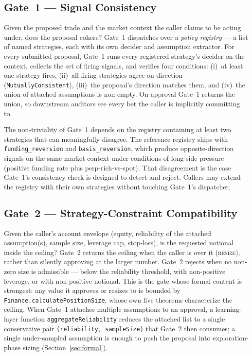 \documentclass[11pt, a4paper]{article}
\begin{document}
\subsection{Gate~1 --- Signal Consistency}
Given the proposed trade and the market context the caller claims to be
acting under, does the proposal cohere? Gate~1 dispatches over a
\emph{policy registry} --- a list of named strategies, each with its own
decider and assumption extractor. For every submitted proposal, Gate~1
runs every registered strategy's decider on the context, collects the
set of firing signals, and verifies four conditions:
(i)~at least one strategy fires, (ii)~all firing strategies agree on
direction (\texttt{MutuallyConsistent}), (iii)~the proposal's direction
matches them, and (iv)~the union of attached assumptions is non-empty.
On approval Gate~1 returns the union, so downstream auditors see every
bet the caller is implicitly committing to.

The non-triviality of Gate~1 depends on the registry containing at
least two strategies that can meaningfully disagree. The reference
registry ships with \texttt{funding\_reversion} and
\texttt{basis\_reversion}, which produce opposite-direction signals on
the same market context under conditions of long-side pressure
(positive funding rate plus perp-rich-vs-spot). That disagreement is
the case Gate~1's consistency check is designed to detect and reject.
Callers may extend the registry with their own strategies without
touching Gate~1's dispatcher.

\subsection{Gate~2 --- Strategy-Constraint Compatibility}
Given the caller's account envelope (equity, reliability of the attached
assumption(s), sample size, leverage cap, stop-loss), is the requested
notional inside the ceiling? Gate~2 returns the ceiling when the caller
is over it (\textsc{resize}), rather than silently approving at the larger
number. Gate~2 rejects when no non-zero size is admissible --- below the
reliability threshold, with non-positive leverage, or with non-positive
notional. This is the gate whose formal content is strongest: any value
it approves or resizes to is bounded by
\texttt{Finance.calculatePositionSize}, whose own five theorems
characterize the ceiling. When Gate~1 attaches multiple assumptions to an
approval, a learning-layer function \texttt{aggregateReliability} reduces
the attached list to a single conservative pair
\texttt{(reliability, sampleSize)} that Gate~2 then consumes; a single
under-sampled assumption is enough to push the proposal into
exploration-phase sizing (Section~\ref{sec:formal}).
\end{document}
